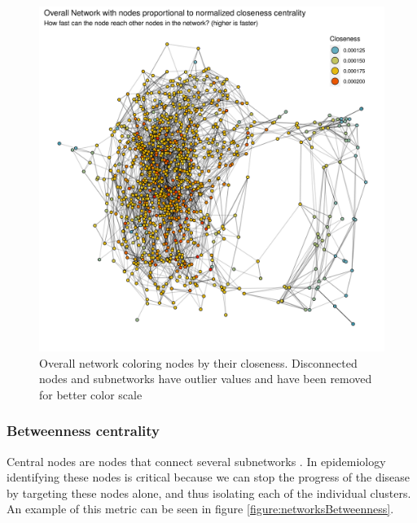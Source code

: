     \begin{figure}[h!]
        \centering
            \includegraphics[width=0.9\linewidth]{figures/Networks/Centralities/Graph_temporalEdgesDF_centralitiesDF_Closeness___mds.png} 
        \caption{Overall network coloring nodes by their closeness. Disconnected nodes and subnetworks have outlier values and have been removed for better color scale}
        \label{figure:networksCloseness}
    \end{figure}      

\subsubsection{Betweenness centrality}

Central nodes are nodes that connect several subnetworks \cite{Freeman1978}. In epidemiology identifying these nodes is critical because we can stop the progress of the disease by targeting these nodes alone, and thus isolating each of the individual clusters. An example of this metric can be seen in figure \ref{figure:networksBetweenness}.

